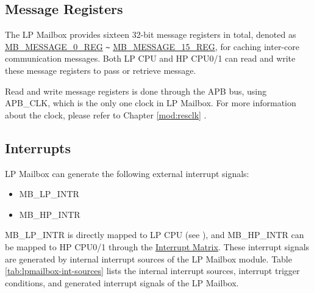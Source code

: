 \documentclass[main\_\_EN.tex]{subfiles}
\begin{document}
\subsection{Message Registers}
The LP Mailbox provides sixteen 32-bit message registers in total, denoted as \hyperref[regdesc:MBMESSAGE0REG]{MB\_MESSAGE\_0\_REG} \verb+~+ \hyperref[regdesc:MBMESSAGE15REG]{MB\_MESSAGE\_15\_REG}, for caching inter-core communication messages. Both LP CPU and HP CPU0/1 can read and write these message registers to pass or retrieve message.

Read and write message registers is done through the APB bus, using APB\_CLK, which is the only one clock in LP Mailbox. For more information about the clock, please refer to Chapter \ref{mod:resclk} \textit{}.

\subsection{Interrupts}
\label{sec:lpmailbox-interrupt}


\chipname{} LP Mailbox can generate the following external interrupt signals:
    \begin{itemize}
        \item MB\_LP\_INTR
        \item MB\_HP\_INTR
    \end{itemize}
MB\_LP\_INTR is directly mapped to LP CPU (see \textit{}), and MB\_HP\_INTR can be mapped to HP CPU0/1 through the \hyperref[mod:intmtrx]{Interrupt Matrix}.
These interrupt signals are generated by internal interrupt sources of the LP Mailbox module. Table \ref{tab:lpmailbox-int-sources} lists the internal interrupt sources, interrupt trigger conditions, and generated interrupt signals of the LP Mailbox.
\end{document}
